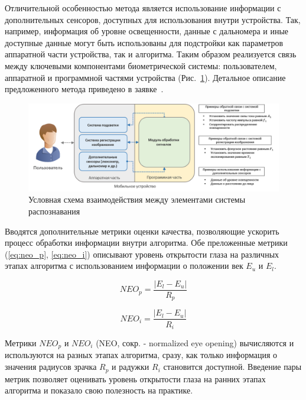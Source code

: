 Отличительной особенностью метода является использование информации с дополнительных сенсоров, доступных для использования внутри устройства. Так, например, информация об уровне освещенности, данные с дальномера и иные доступные данные могут быть использованы для подстройки как параметров аппаратной части устройства, так и алгоритма. Таким образом реализуется связь между ключевыми компонентами биометрической системы: пользователем, аппаратной и программной частями устройства (Рис.~\ref{fig:hw_sw_user_scheme}). Детальное описание предложенного метода приведено в заявке~\cite{odinokikh_patent_2017_irec_ru}.

\begin{figure}[t!]
	\centering
	\includegraphics[width=0.95\columnwidth]{pictures/hw-sw-user-scheme.png}
	\caption{Условная схема взаимодействия между элементами системы распознавания}
	\label{fig:hw_sw_user_scheme}
\end{figure}

Вводятся дополнительные метрики оценки качества, позволяющие ускорить процесс обработки информации внутри алгоритма. Обе преложенные метрики (\ref{eq:neo_p}, \ref{eq:neo_i}) описывают уровень открытости глаза на различных этапах алгоритма с использованием информации о положении век $E_u$ и $E_l$.

\begin{equation}\label{eq:neo_p}
	NEO_p=\frac{|E_l-E_u|}{R_p}
\end{equation}

\begin{equation}\label{eq:neo_i}
	NEO_i=\frac{|E_l-E_u|}{R_i}
\end{equation}

\noindent
Метрики $NEO_p$ и $NEO_i$  (NEO, сокр. - normalized eye opening) вычисляются и используются на разных этапах алгоритма, сразу, как только информация о значения радиусов зрачка $R_p$ и радужки $R_i$ становится доступной. Введение пары метрик позволяет оценивать уровень открытости глаза на ранних этапах алгоритма и показало свою полезность на практике.


